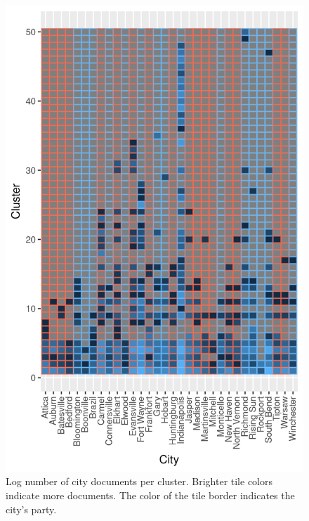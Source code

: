 \documentclass[11pt]{article}
\begin{document}
\begin{figure}[!ht]
	\centering
	\caption{Log number of city documents per cluster. Brighter tile colors indicate more documents. The color of the tile border indicates the city's party.}
	\label{hclustCity50}
	\includegraphics[width=\linewidth]{figures/heatmap_hclust_50.png}
\end{figure}
\end{document}
